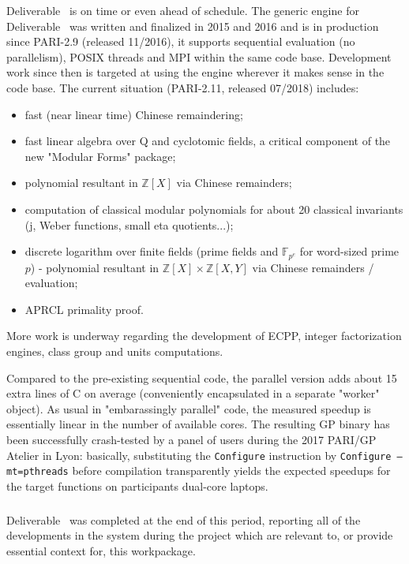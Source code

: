 Deliverable~ is on time or even ahead of schedule.
The generic engine for Deliverable~ was written and
finalized in 2015 and 2016 and is in production since PARI-2.9 (released
11/2016), it supports sequential evaluation (no parallelism), POSIX threads and
MPI within the same code base.
Development work since then is targeted at using the engine wherever it makes
sense in the code base. The current situation (PARI-2.11, released 07/2018)
includes:
\begin{itemize}
\item fast (near linear time) Chinese remaindering;
\item fast linear algebra over Q and cyclotomic fields, a critical component of
the new "Modular Forms" package;
\item polynomial resultant in $\mathbb{Z}[X]$ via Chinese remainders;
\item computation of classical modular polynomials for about 20 classical
invariants (j, Weber functions, small eta quotients...);
\item discrete logarithm over finite fields (prime fields and
$\mathbb{F}_{p^e}$ for word-sized prime $p$) - polynomial resultant in
$\mathbb{Z}[X] \times \mathbb{Z}[X,Y]$ via 
Chinese remainders / evaluation;
\item APRCL primality proof.
\end{itemize}

More work is underway regarding the development of  ECPP, integer
factorization engines, class group and units computations.

Compared to the pre-existing sequential code, the parallel version adds about 15 extra lines of
C on average (conveniently encapsulated in a separate "worker" object). As usual
in "embarassingly parallel" code, the measured speedup is essentially linear in
the number of available cores. The resulting GP binary has been successfully
crash-tested by a panel of users during the 2017 PARI/GP Atelier in Lyon:
basically, substituting the \texttt{Configure} instruction by \texttt{Configure --mt=pthreads}
before compilation transparently yields the expected speedups for the target
functions on participants dual-core laptops. 


\subparagraph{}
\label{hpc@hpc-gap}

Deliverable~ was completed at the end of this period,
reporting all of the developments in the \GAP system during the project which are relevant
to, or provide essential context for, this workpackage.

